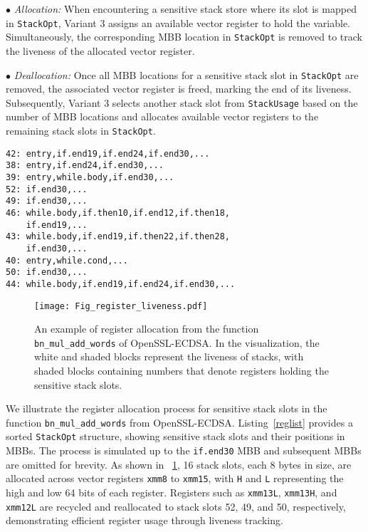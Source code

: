 $\bullet$ \textit{Allocation:} When encountering a sensitive stack store where its slot is mapped in \texttt{StackOpt}, Variant 3 assigns an available vector register to hold the variable. 
Simultaneously, the corresponding MBB location in \texttt{StackOpt} is removed to track the liveness of the allocated vector register.

$\bullet$ \textit{Deallocation:} Once all MBB locations for a sensitive stack slot in \texttt{StackOpt} are removed, the associated vector register is freed, marking the end of its liveness.
Subsequently, Variant 3 selects another stack slot from \texttt{StackUsage} based on the number of MBB locations and allocates available vector registers to the remaining stack slots in \texttt{StackOpt}.

\begin{lstlisting}[basicstyle=\footnotesize, frame=single, caption=Sensitive stack slots contained in MBBs., label=reglist, escapeinside=``]
42: entry,if.end19,if.end24,if.end30,...
38: entry,if.end24,if.end30,...
39: entry,while.body,if.end30,...
52: if.end30,...
49: if.end30,...
46: while.body,if.then10,if.end12,if.then18,
    if.end19,...
43: while.body,if.end19,if.then22,if.then28,
    if.end30,...
40: entry,while.cond,...
50: if.end30,...
44: while.body,if.end19,if.end24,if.end30,...
\end{lstlisting}

\begin{figure}[htbp]
\centering
\texttt{[image: Fig\_register\_liveness.pdf]}
\caption{An example of register allocation from the function \texttt{bn\_mul\_add\_words} of OpenSSL-ECDSA. In the visualization, the white and shaded blocks represent the liveness of stacks, with shaded blocks containing numbers that denote registers holding the sensitive stack slots.}
\label{fig:liveness}
\end{figure}

We illustrate the register allocation process for sensitive stack slots in the function \texttt{bn\_mul\_add\_words} from OpenSSL-ECDSA. Listing~\ref{reglist} provides a sorted \texttt{StackOpt} structure, showing sensitive stack slots and their positions in MBBs.
The process is simulated up to the \texttt{if.end30} MBB and subsequent MBBs are omitted for brevity. 
As shown in \F~\ref{fig:liveness}, 16 stack slots, each 8 bytes in size, are allocated across vector registers \texttt{xmm8} to \texttt{xmm15}, with \texttt{H} and \texttt{L} representing the high and low 64 bits of each register. 
Registers such as \texttt{xmm13L}, \texttt{xmm13H}, and \texttt{xmm12L} are recycled and reallocated to stack slots 52, 49, and 50, respectively, demonstrating efficient register usage through liveness tracking.

